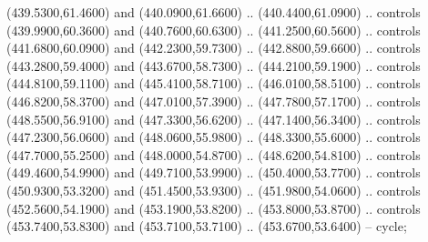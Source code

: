 {\begin{scope}[y=0.80pt, x=0.80pt, yscale=-1, xscale=1, inner sep=0pt, outer sep=0pt, #1]
      (439.5300,61.4600) and (440.0900,61.6600) .. (440.4400,61.0900) .. controls
      (439.9900,60.3600) and (440.7600,60.6300) .. (441.2500,60.5600) .. controls
      (441.6800,60.0900) and (442.2300,59.7300) .. (442.8800,59.6600) .. controls
      (443.2800,59.4000) and (443.6700,58.7300) .. (444.2100,59.1900) .. controls
      (444.8100,59.1100) and (445.4100,58.7100) .. (446.0100,58.5100) .. controls
      (446.8200,58.3700) and (447.0100,57.3900) .. (447.7800,57.1700) .. controls
      (448.5500,56.9100) and (447.3300,56.6200) .. (447.1400,56.3400) .. controls
      (447.2300,56.0600) and (448.0600,55.9800) .. (448.3300,55.6000) .. controls
      (447.7000,55.2500) and (448.0000,54.8700) .. (448.6200,54.8100) .. controls
      (449.4600,54.9900) and (449.7100,53.9900) .. (450.4000,53.7700) .. controls
      (450.9300,53.3200) and (451.4500,53.9300) .. (451.9800,54.0600) .. controls
      (452.5600,54.1900) and (453.1900,53.8200) .. (453.8000,53.8700) .. controls
      (453.7400,53.8300) and (453.7100,53.7100) .. (453.6700,53.6400) -- cycle;


\end{scope}}

